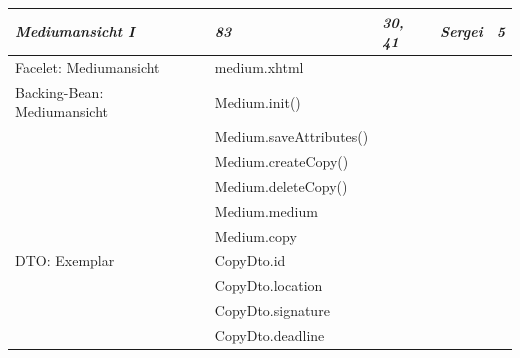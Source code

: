 \documentclass{article}
\begin{document}
\begin{longtable}{|l|l|l|l|l|}
\hline
\textbf{\textit{Mediumansicht I}}       & \textbf{\textit{83}}                     & \textbf{\textit{30, 41}}  & \textbf{\textit{Sergei}}    & \textbf{\textit{5}}    \\ 
\hline
Facelet: Mediumansicht                  & medium.xhtml                             &                           &                             &                        \\ 
\hline
Backing-Bean: Mediumansicht             & Medium.init()                            &                           &                             &                        \\ 
\hline
                                        & Medium.saveAttributes()                  &                           &                             &                        \\ 
\hline
                                        & Medium.createCopy()                      &                           &                             &                        \\ 
\hline
                                        & Medium.deleteCopy()                      &                           &                             &                        \\ 
\hline
                                        & Medium.medium                            &                           &                             &                        \\ 
\hline
                                        & Medium.copy                              &                           &                             &                        \\ 
\hline
DTO: Exemplar                           & CopyDto.id                               &                           &                             &                        \\ 
\hline
                                        & CopyDto.location                         &                           &                             &                        \\ 
\hline
                                        & CopyDto.signature                        &                           &                             &                        \\ 
\hline
                                        & CopyDto.deadline                         &                           &                             &                        \\ 

\end{longtable}
\end{document}
